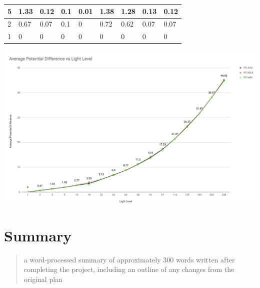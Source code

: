 \documentclass{article}
\begin{document}
\begin{table}[]
\begin{tabular}{|l|l|l|l|l|l|l|l|l|}
5                                                                               & 1.33                  & 0.12                  & 0.1                   & 0.01                  & 1.38                  & 1.28                  & 0.13                  & 0.12                  \\ \hline
2                                                                               & 0.67                  & 0.07                  & 0.1                   & 0                     & 0.72                  & 0.62                  & 0.07                  & 0.07                  \\ \hline
1                                                                               & 0                     & 0                     & 0                     & 0                     & 0                     & 0                     & 0                     & 0                     \\ \hline
\end{tabular}
\end{table}

\includegraphics[scale=0.4]{pd_error_bars}


\section{Summary}
\begin{quote}
  a word-processed summary of approximately 300 words written after completing the project, including an outline of any changes from the original plan
\end{quote}
\end{document}
